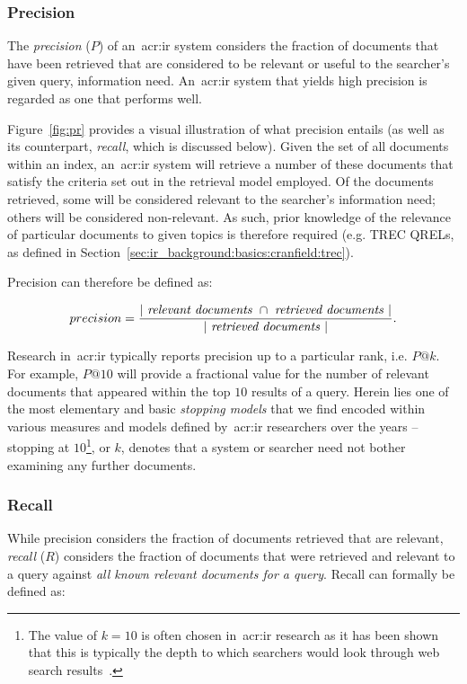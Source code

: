 \subsubsection{Precision}\label{sec:ir_background:evaluation:precision}
The \emph{precision} ($P$) of an~\gls{acr:ir} system considers the fraction of documents that have been retrieved that are considered to be relevant or useful to the searcher's given query, information need. An~\gls{acr:ir} system that yields high precision is regarded as one that performs well.

Figure~\ref{fig:pr} provides a visual illustration of what precision entails (as well as its counterpart, \emph{recall}, which is discussed below). Given the set of all documents within an index, an~\gls{acr:ir} system will retrieve a number of these documents that satisfy the criteria set out in the retrieval model employed. Of the documents retrieved, some will be considered relevant to the searcher's information need; others will be considered non-relevant. As such, prior knowledge of the relevance of particular documents to given topics is therefore required (e.g. TREC QRELs, as defined in Section~\ref{sec:ir_background:basics:cranfield:trec}).

Precision can therefore be defined as:

\begin{equation*}
precision = \frac{|~\text{\emph{relevant documents}}~\cap~\text{\emph{retrieved documents}}~|}{|~\text{\emph{retrieved documents}}~|}.
\end{equation*}

Research in~\gls{acr:ir} typically reports precision up to a particular rank, i.e. $P@k$. For example, $P@10$ will provide a fractional value for the number of relevant documents that appeared within the top $10$ results of a query. Herein lies one of the most elementary and basic \emph{stopping models} that we find encoded within various measures and models defined by~\gls{acr:ir} researchers over the years -- stopping at $10$\footnote{The value of $k=10$ is often chosen in~\gls{acr:ir} research as it has been shown that this is typically the depth to which searchers would look through web search results~\citep{jansen2006www}.}, or $k$, denotes that a system or searcher need not bother examining any further documents.

\subsubsection{Recall}
While precision considers the fraction of documents retrieved that are relevant, \emph{recall} ($R$) considers the fraction of documents that were retrieved and relevant to a query against \emph{all known relevant documents for a query}. Recall can formally be defined as:

